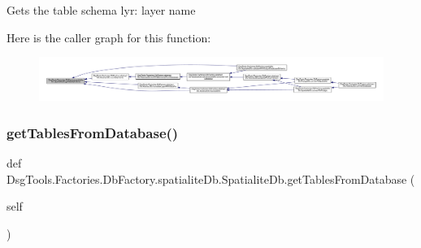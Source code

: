 \begin{DoxyVerb}Gets the table schema
lyr: layer name
\end{DoxyVerb}
 Here is the caller graph for this function\+:
\nopagebreak
\begin{figure}[H]
\begin{center}
\leavevmode
\includegraphics[width=350pt]{class_dsg_tools_1_1_factories_1_1_db_factory_1_1spatialite_db_1_1_spatialite_db_af91a3c13a7dd2782cd555bfd376eeaa3_icgraph}
\end{center}
\end{figure}
\mbox{\label{class_dsg_tools_1_1_factories_1_1_db_factory_1_1spatialite_db_1_1_spatialite_db_aaae60033f57202171d14f0c266b5fe36}} 
\subsubsection{\texorpdfstring{get\+Tables\+From\+Database()}{getTablesFromDatabase()}}
{\footnotesize\ttfamily def Dsg\+Tools.\+Factories.\+Db\+Factory.\+spatialite\+Db.\+Spatialite\+Db.\+get\+Tables\+From\+Database (\begin{DoxyParamCaption}\item[{}]{self }\end{DoxyParamCaption})}

